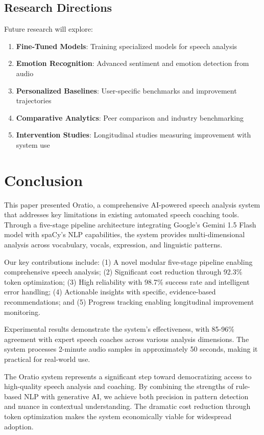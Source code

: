 \documentclass[conference]{IEEEtran}
\begin{document}
\subsection{Research Directions}

Future research will explore:

\begin{enumerate}
    \item \textbf{Fine-Tuned Models}: Training specialized models for speech analysis
    \item \textbf{Emotion Recognition}: Advanced sentiment and emotion detection from audio
    \item \textbf{Personalized Baselines}: User-specific benchmarks and improvement trajectories
    \item \textbf{Comparative Analytics}: Peer comparison and industry benchmarking
    \item \textbf{Intervention Studies}: Longitudinal studies measuring improvement with system use
\end{enumerate}

\section{Conclusion}

This paper presented Oratio, a comprehensive AI-powered speech analysis system that addresses key limitations in existing automated speech coaching tools. Through a five-stage pipeline architecture integrating Google's Gemini 1.5 Flash model with spaCy's NLP capabilities, the system provides multi-dimensional analysis across vocabulary, vocals, expression, and linguistic patterns.

Our key contributions include: (1) A novel modular five-stage pipeline enabling comprehensive speech analysis; (2) Significant cost reduction through 92.3\% token optimization; (3) High reliability with 98.7\% success rate and intelligent error handling; (4) Actionable insights with specific, evidence-based recommendations; and (5) Progress tracking enabling longitudinal improvement monitoring.

Experimental results demonstrate the system's effectiveness, with 85-96\% agreement with expert speech coaches across various analysis dimensions. The system processes 2-minute audio samples in approximately 50 seconds, making it practical for real-world use.

The Oratio system represents a significant step toward democratizing access to high-quality speech analysis and coaching. By combining the strengths of rule-based NLP with generative AI, we achieve both precision in pattern detection and nuance in contextual understanding. The dramatic cost reduction through token optimization makes the system economically viable for widespread adoption.
\end{document}
